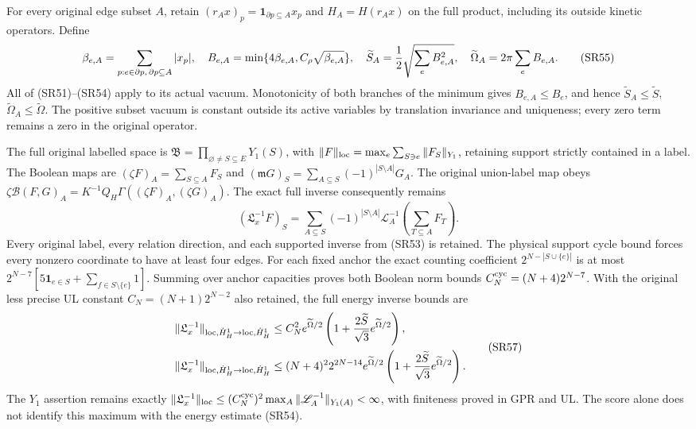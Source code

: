 \documentclass[11pt]{article}
\begin{document}
For every original edge subset \(A\), retain \((r_Ax)_p=\mathbf1_{\partial p\subseteq A}x_p\) and \(H_A=H(r_Ax)\) on the full product, including its outside kinetic operators. Define
\[
\beta_{e,A}=\sum_{p:e\in\partial p,\,\partial p\subseteq A}|x_p|,\quad
B_{e,A}=\min\{4\beta_{e,A},C_\rho\sqrt{\beta_{e,A}}\},\quad
\widetilde S_A={1\over2}\sqrt{\sum_eB_{e,A}^2},\quad
\widetilde\Omega_A=2\pi\sum_eB_{e,A}.
\tag{SR55}
\]
All of (SR51)–(SR54) apply to its actual vacuum. Monotonicity of both branches of the minimum gives \(B_{e,A}\le B_e\), and hence \(\widetilde S_A\le\widetilde S\), \(\widetilde\Omega_A\le\widetilde\Omega\). The positive subset vacuum is constant outside its active variables by translation invariance and uniqueness; every zero term remains a zero in the original operator.

The full original labelled space is \(\mathfrak B=\prod_{\varnothing\ne S\subseteq E}Y_1(S)\), with \(\|F\|_{\rm loc}=\max_e\sum_{S\ni e}\|F_S\|_{Y_1}\), retaining support strictly contained in a label. The Boolean maps are \((\zeta F)_A=\sum_{S\subseteq A}F_S\) and \((\mathfrak mG)_S=\sum_{A\subseteq S}(-1)^{|S\setminus A|}G_A\). The original union-label map obeys
\(\zeta\mathcal B(F,G)_A=K^{-1}Q_H\Gamma((\zeta F)_A,(\zeta G)_A)\).
The exact full inverse consequently remains
\[
(\mathfrak L_x^{-1}F)_S
=\sum_{A\subseteq S}(-1)^{|S\setminus A|}\mathscr L_A^{-1}
\left(\sum_{T\subseteq A}F_T\right).
\tag{SR56}
\]
Every original label, every relation direction, and each supported inverse from (SR53) is retained. The physical support cycle bound forces every nonzero coordinate to have at least four edges. For each fixed anchor the exact counting coefficient \(2^{N-|S\cup\{e\}|}\) is at most
\(2^{N-7}[5\mathbf1_{e\in S}+\sum_{f\in S\setminus\{e\}}1]\).
Summing over anchor capacities proves both Boolean norm bounds \(C_N^{\rm cyc}=(N+4)2^{N-7}\). With the original less precise UL constant \(C_N=(N+1)2^{N-2}\) also retained, the full energy inverse bounds are
\[
\begin{aligned}
\|\mathfrak L_x^{-1}\|_{{\rm loc},\dot H^1_H\to{\rm loc},\dot H^1_H}
&\le C_N^2 e^{\widetilde\Omega/2}
\left(1+{2\widetilde S\over\sqrt3}e^{\widetilde\Omega/2}\right),\\
\|\mathfrak L_x^{-1}\|_{{\rm loc},\dot H^1_H\to{\rm loc},\dot H^1_H}
&\le (N+4)^2 2^{2N-14} e^{\widetilde\Omega/2}
\left(1+{2\widetilde S\over\sqrt3}e^{\widetilde\Omega/2}\right).
\end{aligned}\tag{SR57}
\]
The \(Y_1\) assertion remains exactly \(\|\mathfrak L_x^{-1}\|_{\rm loc}\le(C_N^{\rm cyc})^2\max_A\|\mathscr L_A^{-1}\|_{Y_1(A)}<\infty\), with finiteness proved in GPR and UL. The score alone does not identify this maximum with the energy estimate (SR54).
\end{document}
